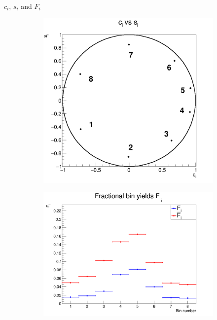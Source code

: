 \documentclass{beamer}
\begin{document}
\begin{frame}{$c_i$, $s_i$ and $F_i$}
  \begin{figure}
    \centering
    \vspace{-0.2cm}
    \begin{subfigure}{0.425\textwidth}
      \includegraphics[width = 1.0\textwidth]{Plots/StrongPhaseParametersPlot_cisi_8Bins.png}
    \end{subfigure}%
    \begin{subfigure}{0.575\textwidth}
      \includegraphics[width = 1.0\textwidth]{Plots/StrongPhaseParametersPlot_Fi_8Bins.png}
    \end{subfigure}
  \end{figure}
\end{frame}
\end{document}
